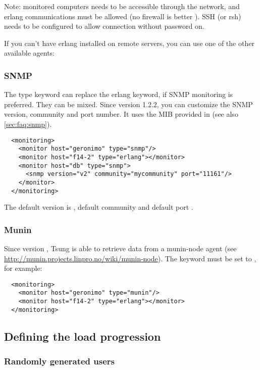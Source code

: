 \documentclass{TSUNG-en}
\begin{document}
Note: monitored computers needs to be
accessible through the network, and erlang communications must be
allowed (no firewall is better ). SSH (or rsh) needs to be configured to
allow connection without password on. 

If you can't have erlang installed on remote servers, you can use one
of the other available agents:

\subsubsection{SNMP}
The type keyword  can replace the erlang keyword, if SNMP monitoring
is preferred. They can be mixed. Since version 1.2.2, you can customize the SNMP version,
community and port number. It uses the MIB provided in
 (see also \ref{sec:faq:snmp}).

\begin{Verbatim}
  <monitoring>
    <monitor host="geronimo" type="snmp"/>
    <monitor host="f14-2" type="erlang"></monitor>
    <monitor host="db" type="snmp">
      <snmp version="v2" community="mycommunity" port="11161"/>
    </monitor>
  </monitoring>
\end{Verbatim}

The default version is , default community
 and default port .

\subsubsection{Munin}

Since version , Tsung is able to retrieve data from a munin-node agent
(see \url{http://munin.projects.linpro.no/wiki/munin-node}). The 
keyword must be set to , for example:

\begin{Verbatim}
  <monitoring>
    <monitor host="geronimo" type="munin"/>
    <monitor host="f14-2" type="erlang"></monitor>
  </monitoring>
\end{Verbatim}

\subsection{Defining the load progression}

\subsubsection{Randomly generated users}
\end{document}
